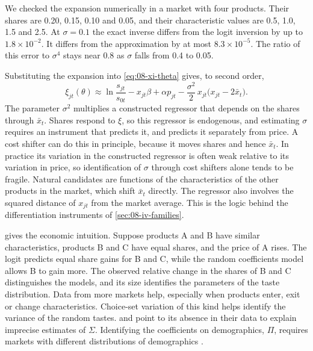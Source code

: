 We checked the expansion numerically in a market with four products. Their shares are 0.20, 0.15, 0.10 and
0.05, and their characteristic values are 0.5, 1.0, 1.5 and 2.5. At $\sigma = 0.1$ the exact inverse differs from the logit
inversion by up to $1.8 \times 10^{-2}$. It differs from the approximation by at most $8.3 \times 10^{-5}$. The
ratio of this error to $\sigma^4$ stays near 0.8 as $\sigma$ falls from 0.4 to 0.05.

Substituting the expansion into \eqref{eq:08-xi-theta} gives, to second order,
\begin{equation*}
  \xi_{jt}(\theta) \approx \ln\frac{s_{jt}}{s_{0t}} - x_{jt}\beta + \alpha p_{jt} - \frac{\sigma^2}{2}\,
  x_{jt}\big(x_{jt} - 2\bar x_t\big).
\end{equation*}
The parameter $\sigma^2$ multiplies a constructed regressor that depends on the shares through $\bar x_t$.
Shares respond to $\xi$, so this regressor is endogenous, and estimating $\sigma$ requires an instrument that
predicts it, and predicts it separately from price. A cost shifter can do this in principle, because it moves
shares and hence $\bar x_t$. In practice its variation in the constructed regressor is often weak relative to its
variation in price, so identification of $\sigma$ through cost shifters alone tends to be fragile. Natural candidates
are functions of the characteristics of the other products in the market, which shift $\bar x_t$ directly. The regressor also involves the
squared distance of $x_{jt}$ from the market average. This is the logic behind the differentiation instruments
of \cref{sec:08-iv-families}.

\citet[pp.~529--530]{Nevo2000a} gives the economic intuition. Suppose products A and B have similar
characteristics, products B and C have equal shares, and the price of A rises. The logit predicts equal share
gains for B and C, while the random coefficients model allows B to gain more. The observed relative change in
the shares of B and C distinguishes the models, and its size identifies the parameters of the taste
distribution. Data from more markets help, especially when products enter, exit or change characteristics.
Choice-set variation of this kind helps identify the variance of the random tastes. \citet[p.~541]{Nevo2000a}
and \citet[p.~330, n.~27]{Nevo2001} point to its absence in their data to explain imprecise estimates of
$\Sigma$. Identifying the coefficients on demographics, $\Pi$, requires markets with different distributions
of demographics \citep[p.~529]{Nevo2000a}.

